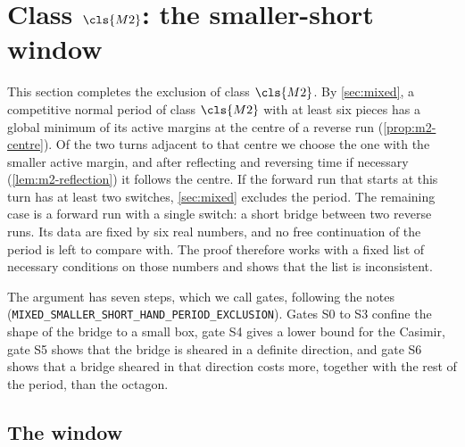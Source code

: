 \section{Class \texorpdfstring{$\cls{M2}$}{M2}: the smaller-short window}\label{sec:smaller-short}

This section completes the exclusion of class $\cls{M2}$. By \cref{sec:mixed}, a competitive
normal period of class $\cls{M2}$ with at least six pieces has a global minimum of its active
margins at the centre of a reverse run (\cref{prop:m2-centre}). Of the two turns adjacent to that
centre we choose the one with the smaller active margin, and after reflecting and reversing time
if necessary (\cref{lem:m2-reflection}) it follows the centre. If the forward run that starts at
this turn has at least two switches, \cref{sec:mixed} excludes the period. The remaining case is a
forward run with a single switch: a short bridge between two reverse runs. Its data are fixed by
six real numbers, and no free continuation of the period is left to compare with. The proof
therefore works with a fixed list of necessary conditions on those numbers and shows that the list
is inconsistent.

The argument has seven steps, which we call gates, following the notes~\cite{Notes}
(\texttt{MIXED\_SMALLER\_SHORT\_HAND\_PERIOD\_EXCLUSION}). Gates S0 to S3 confine the shape of
the bridge to a small box, gate S4 gives a lower bound for the Casimir, gate S5 shows that the
bridge is sheared in a definite direction, and gate S6 shows that a bridge sheared in that
direction costs more, together with the rest of the period, than the octagon.

\subsection{The window}\label{sec:ss-window}


